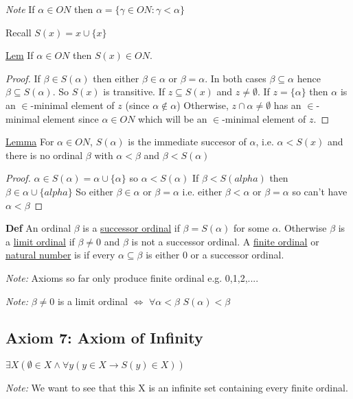 \documentclass{article}
\begin{document}
    \emph{Note} If $\alpha \in ON$ then $\alpha = \{\gamma \in ON : \gamma < \alpha\}$

    Recall $S(x) = x \cup \{x\}$

    \underline{Lem} If $\alpha \in ON$ then $S(x) \in ON$.
    \begin{proof}
        If $\beta \in S(\alpha)$ then either $\beta \in \alpha$ or $\beta = \alpha$.
        In both cases $\beta \subseteq \alpha$ hence $\beta \subseteq S(\alpha)$.
        So $S(x)$ is transitive.
        If $z \subseteq S(x)$ and $z \neq \emptyset$.
        If $z = \{\alpha\}$ then $\alpha$ is an $\in$-minimal element of $z$ (since $\alpha \notin \alpha$)
        Otherwise, $z \cap \alpha \neq \emptyset$ has an $\in$-minimal element since $\alpha \in ON$ which will be an $\in$-minimal element of $z$.
    \end{proof}

    \underline{Lemma} For $\alpha \in ON$, $S(\alpha)$ is the immediate succesor of $\alpha$, i.e. $\alpha < S(x)$ and there is no ordinal $\beta$ with $\alpha < \beta$ and $\beta < S(\alpha)$
    \begin{proof}
        $\alpha \in S(\alpha) = \alpha \cup \{\alpha\}$ so $\alpha < S(\alpha)$
        If $\beta < S(alpha)$ then $\beta \in \alpha \cup \{alpha\}$
        So either $\beta \in \alpha$ or $\beta = \alpha$
        i.e. either $\beta < \alpha$ or $\beta = \alpha$ so can't have $\alpha < \beta$
    \end{proof}

    \textbf{Def} An ordinal $\beta$ is a \underline{successor ordinal} if $\beta = S(\alpha)$ for some $\alpha$.
    Otherwise $\beta$ is a \underline{limit ordinal} if $\beta \neq 0$ and $\beta$ is not a successor ordinal.
    A \underline{finite ordinal} or \underline{natural number} is if every $\alpha \subseteq \beta$ is either 0 or a successor ordinal.

    \emph{Note:} Axioms so far only produce finite ordinal e.g. 0,1,2,....

    \emph{Note:} $\beta \neq 0$ is a limit ordinal $\iff$ $\forall \alpha < \beta$ $S(\alpha) < \beta$

    \subsection{Axiom 7: Axiom of Infinity}
    $\exists X (\emptyset \in X \wedge \forall y (y \in X \rightarrow S(y) \in X))$

    \emph{Note: } We want to see that this X is an infinite set containing every finite ordinal.
\end{document}
